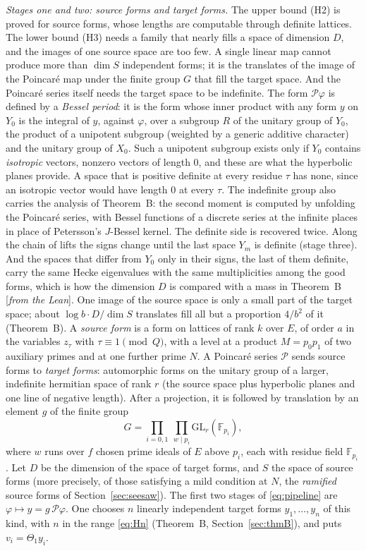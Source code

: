 \documentclass[11pt]{amsart}
\numberwithin{equation}{section}
\theoremstyle{definition}
\theoremstyle{remark}
\newcommand{\status}[1]{\textup{[\emph{#1}]}}
\begin{document}
\emph{Stages one and two: source forms and target forms.} The upper bound (H2) is proved for source forms, whose lengths are computable through definite lattices. The lower bound (H3) needs a family that nearly fills a space of dimension $D$, and the images of one source space are too few. A single linear map cannot produce more than $\dim S$ independent forms; it is the translates of the image of the Poincar\'e map under the finite group $G$ that fill the target space. And the Poincar\'e series itself needs the target space to be indefinite. The form $\mathcal P\varphi$ is defined by a \emph{Bessel period}: it is the form whose inner product with any form $y$ on $Y_0$ is the integral of $y$, against $\varphi$, over a subgroup $R$ of the unitary group of $Y_0$, the product of a unipotent subgroup (weighted by a generic additive character) and the unitary group of $X_0$. Such a unipotent subgroup exists only if $Y_0$ contains \emph{isotropic} vectors, nonzero vectors of length $0$, and these are what the hyperbolic planes provide. A space that is positive definite at every residue $\tau$ has none, since an isotropic vector would have length $0$ at every $\tau$. The indefinite group also carries the analysis of Theorem~B: the second moment is computed by unfolding the Poincar\'e series, with Bessel functions of a discrete series at the infinite places in place of Petersson's $J$-Bessel kernel. The definite side is recovered twice. Along the chain of lifts the signs change until the last space $Y_m$ is definite (stage three). And the spaces that differ from $Y_0$ only in their signs, the last of them definite, carry the same Hecke eigenvalues with the same multiplicities among the good forms, which is how the dimension $D$ is compared with a mass in Theorem~B \status{from the Lean}. One image of the source space is only a small part of the target space; about $\log b\cdot D/\dim S$ translates fill all but a proportion $4/b^2$ of it (Theorem~B). A \emph{source form} is a form on lattices of rank $k$ over $E$, of order $a$ in the variables $z_\tau$ with $\tau\equiv1\pmod Q$, with a level at a product $M=p_0p_1$ of two auxiliary primes and at one further prime $N$. A Poincar\'e series $\mathcal P$ sends source forms to \emph{target forms}: automorphic forms on the unitary group of a larger, indefinite hermitian space of rank $r$ (the source space plus hyperbolic planes and one line of negative length). After a projection, it is followed by translation by an element $g$ of the finite group
\begin{equation}\label{eq:Ggroup}
 G=\prod_{i=0,1}\ \prod_{w\mid p_i}\mathrm{GL}_r(\mathbb F_{p_i}),
\end{equation}
where $w$ runs over $f$ chosen prime ideals of $E$ above $p_i$, each with residue field $\mathbb F_{p_i}$. Let $D$ be the dimension of the space of target forms, and $S$ the space of source forms (more precisely, of those satisfying a mild condition at $N$, the \emph{ramified} source forms of Section~\ref{sec:seesaw}). The first two stages of \eqref{eq:pipeline} are $\varphi\mapsto y=g\,\mathcal P\varphi$. One chooses $n$ linearly independent target forms $y_1,\dots,y_n$ of this kind, with $n$ in the range \eqref{eq:Hn} (Theorem~B, Section~\ref{sec:thmB}), and puts $v_i=\Theta_1y_i$.
\end{document}

